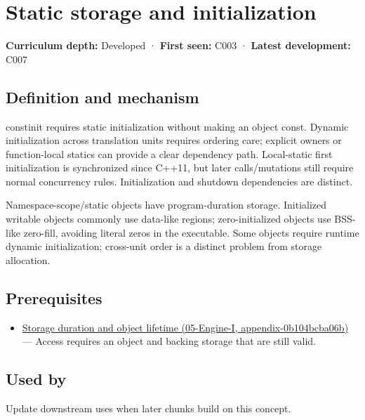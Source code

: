 \hypertarget{appendix-17c93c4c2f19}{}
\section{Static storage and initialization}\label{appendix-17c93c4c2f19-static-storage-and-initialization}

\textbf{Curriculum depth:} Developed · \textbf{First seen:} C003 · \textbf{Latest development:} C007

\subsection{Definition and mechanism}\label{appendix-17c93c4c2f19-definition-and-mechanism}

constinit requires static initialization without making an object const. Dynamic initialization across translation units requires ordering care; explicit owners or function-local statics can provide a clear dependency path. Local-static first initialization is synchronized since C++11, but later calls/mutations still require normal concurrency rules. Initialization and shutdown dependencies are distinct.

Namespace-scope/static objects have program-duration storage. Initialized writable objects commonly use data-like regions; zero-initialized objects use BSS-like zero-fill, avoiding literal zeros in the executable. Some objects require runtime dynamic initialization; cross-unit order is a distinct problem from storage allocation.

\subsection{Prerequisites}\label{appendix-17c93c4c2f19-prerequisites}

\begin{itemize}
\tightlist
\item
  \href{../05-Engine-I/main.pdf\#nameddest=appendix-0b104bcba06b}{Storage duration and object lifetime (05-Engine-I, appendix-0b104bcba06b)} --- Access requires an object and backing storage that are still valid.
\end{itemize}

\subsection{Used by}\label{appendix-17c93c4c2f19-used-by}

Update downstream uses when later chunks build on this concept.


